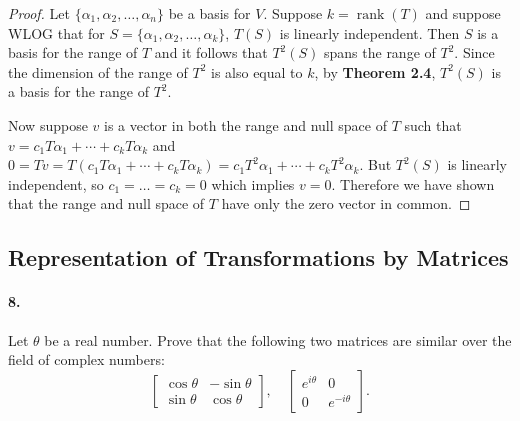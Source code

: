 \documentclass{article}
\DeclareMathOperator{\rank}{rank}
\begin{document}
\begin{proof}
  Let $\{\alpha_1, \alpha_2, \ldots, \alpha_n\}$ be a basis for $V$. Suppose
  $k = \rank(T)$ and suppose WLOG that for $S = \{\alpha_1, \alpha_2, \ldots,
  \alpha_k\}$, $T(S)$ is linearly independent. Then $S$ is a basis for the range
  of $T$ and it follows that $T^2(S)$ spans the range of $T^2$. Since the
  dimension of the range of $T^2$ is also equal to $k$, by \textbf{Theorem 2.4},
  $T^2(S)$ is a basis for the range of $T^2$.

  Now suppose $v$ is a vector in both the range and null space of $T$ such that
  $v = c_1T\alpha_1 + \cdots + c_kT\alpha_k$ and $0 = Tv = T(c_1T\alpha_1 +
  \cdots + c_kT\alpha_k) = c_1T^2\alpha_1 + \cdots + c_kT^2\alpha_k$. But
  $T^2(S)$ is linearly independent, so $c_1 = \ldots = c_k = 0$ which implies
  $v = 0$. Therefore we have shown that the range and null space of $T$ have
  only the zero vector in common.
\end{proof}

\setcounter{subsection}{3}
\subsection{Representation of Transformations by Matrices}

\paragraph{8.} Let $\theta$ be a real number. Prove that the following two
matrices are similar over the field of complex numbers: \[
  \begin{bmatrix}
    \cos\theta & -\sin\theta \\ \sin\theta & \cos\theta
  \end{bmatrix},\quad
  \begin{bmatrix}
    e^{i\theta} & 0 \\ 0 & e^{-i\theta}
  \end{bmatrix}.
\]
\end{document}

